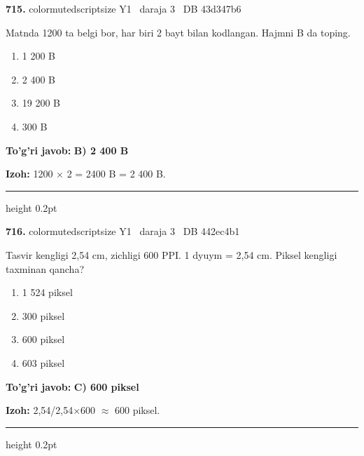 \documentclass[10pt,a4paper,oneside]{article}
\begin{document}
\noindent\textbf{\color{ink}715.}  {color{muted}scriptsize Y1 \textbullet\ daraja 3 \textbullet\ DB 43d347b6}
\par
Matnda 1200 ta belgi bor, har biri 2 bayt bilan kodlangan. Hajmni B da toping.
\begin{enumerate}[label=\Alph*),leftmargin=9mm]
\item 1 200 B
\item 2 400 B
\item 19 200 B
\item 300 B
\end{enumerate}
\begin{tcolorbox}[enhanced,breakable,colback=teal!4,colframe=teal!50!black,boxrule=0.5pt,arc=1.1mm,left=3mm,right=3mm,top=1.7mm,bottom=1.7mm,before skip=2mm,after skip=2mm]
\textbf{\color{teal}To'g'ri javob:} \textbf{B) 2 400 B}
\par\smallskip
\textbf{Izoh:} 1200 \ensuremath{\times} 2 = 2400 B = 2 400 B.
\end{tcolorbox}
\vspace{2mm}\hrule height 0.2pt \vspace{3mm}

\noindent\textbf{\color{ink}716.}  {color{muted}scriptsize Y1 \textbullet\ daraja 3 \textbullet\ DB 442ec4b1}
\par
Tasvir kengligi 2,54 cm, zichligi 600 PPI. 1 dyuym = 2,54 cm. Piksel kengligi taxminan qancha?
\begin{enumerate}[label=\Alph*),leftmargin=9mm]
\item 1 524 piksel
\item 300 piksel
\item 600 piksel
\item 603 piksel
\end{enumerate}
\begin{tcolorbox}[enhanced,breakable,colback=teal!4,colframe=teal!50!black,boxrule=0.5pt,arc=1.1mm,left=3mm,right=3mm,top=1.7mm,bottom=1.7mm,before skip=2mm,after skip=2mm]
\textbf{\color{teal}To'g'ri javob:} \textbf{C) 600 piksel}
\par\smallskip
\textbf{Izoh:} 2,54/2,54\ensuremath{\times}600 \ensuremath{\approx} 600 piksel.
\end{tcolorbox}
\vspace{2mm}\hrule height 0.2pt \vspace{3mm}
\end{document}
